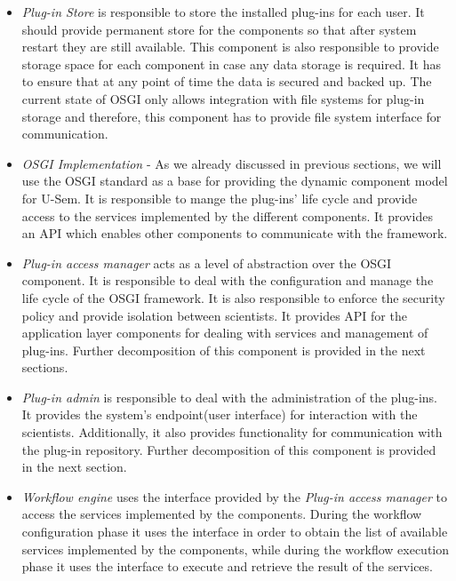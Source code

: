 \begin{itemize}

\item \textit{Plug-in Store} is responsible to store the installed plug-ins for each user. It should provide permanent store for the components so that after system restart they are still available. This component is also responsible to provide storage space for each component in case any data storage is required. It has to ensure that at any point of time the data is secured and backed up. The current state of OSGI only allows integration with file systems for plug-in storage and therefore, this component has to provide file system interface for communication.

\item \textit{OSGI Implementation} - As we already discussed in previous sections, we will use the OSGI standard as a base for providing the dynamic component model for U-Sem. It is responsible to mange the plug-ins' life cycle and provide access to the services implemented by the different components. It provides an API which enables other components to communicate with the framework.

\item \textit{Plug-in access manager} acts as a level of abstraction over the OSGI component. It is responsible to deal with the configuration and manage the life cycle of the OSGI framework. It is also responsible to enforce the security policy and provide isolation between scientists. It provides API for the application layer components for dealing with services and management of plug-ins. Further decomposition of this component is provided in the next sections.

\item \textit{Plug-in admin} is responsible to deal with the administration of the plug-ins. It provides the system's endpoint(user interface) for interaction with the scientists. Additionally, it also provides functionality for communication with the plug-in repository. Further decomposition of this component is provided in the next section. 

\item \textit{Workflow engine} uses the interface provided by the \textit{Plug-in access manager} to access the services implemented by the components. During the workflow configuration phase it uses the interface in order to obtain the list of available services implemented by the components, while during the workflow execution phase it uses the interface to execute and retrieve the result of the services.
	
\end{itemize}


